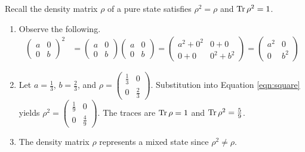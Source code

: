 \begin{answer}
	Recall the density matrix $\rho$ of a pure state satisfies $\rho^2 = \rho$ and $\operatorname{Tr} \rho^2 = 1$.
	\begin{enumerate}
		\item Observe the following.
		      \begin{align}\label{eqn:square}
			      \begin{pmatrix}
				      a & 0 \\
				      0 & b
			      \end{pmatrix}^2
			       & =
			      \begin{pmatrix}
				      a & 0 \\
				      0 & b
			      \end{pmatrix}
			      \begin{pmatrix}
				      a & 0 \\
				      0 & b
			      \end{pmatrix}
			      =
			      \begin{pmatrix}
				      a^2 + 0^2 & 0 + 0     \\
				      0 + 0     & 0^2 + b^2
			      \end{pmatrix}
			      =
			      \begin{pmatrix}
				      a^2 & 0   \\
				      0   & b^2
			      \end{pmatrix}
		      \end{align}
		\item Let $a = \frac{1}{3}$, $b = \frac{2}{3}$, and $\rho = \begin{pmatrix} \frac{1}{3} & 0 \\ 0 & \frac{2}{3} \end{pmatrix}$.
		      Substitution into Equation \eqref{eqn:square} yields $\rho^2 = \begin{pmatrix} \frac{1}{9} & 0 \\ 0 & \frac{4}{9} \end{pmatrix}$.
		      The traces are $\operatorname{Tr} \rho = 1$ and $\operatorname{Tr} \rho^2 = \frac{5}{9}$.
		\item The density matrix $\rho$ represents a mixed state since $\rho^2 \neq \rho$.
	\end{enumerate}
\end{answer}

